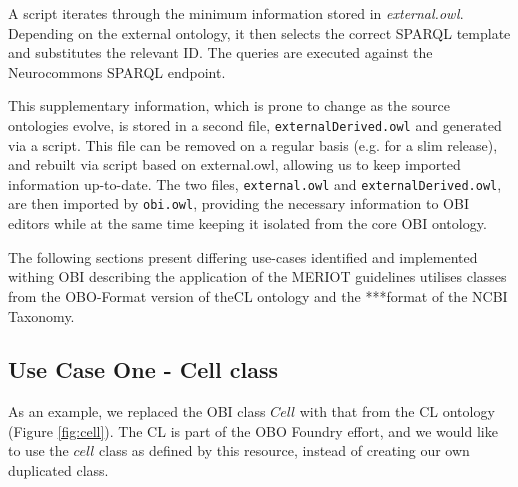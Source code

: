 \documentclass[a4paper,10pt,twocolumn]{article}
\begin{document}
A script iterates through the minimum information stored in \emph{external.owl}.
Depending on the external ontology, it then selects the correct SPARQL template and substitutes the relevant ID.
The queries are executed against the Neurocommons SPARQL endpoint\cite{RefWorks:1540}.

This supplementary information, which is prone to change as the source ontologies evolve, is stored in a second file, \texttt{externalDerived.owl} and generated via a script. 
This file can be removed on a regular basis (e.g. for a slim release), and rebuilt via script based on \texttt{}{external.owl}, allowing us to keep imported information up-to-date.
The two files, \texttt{external.owl} and \texttt{externalDerived.owl}, are then imported by \texttt{obi.owl}, providing the necessary information to OBI editors while at the same time keeping it isolated from the core OBI ontology.

The following sections present differing use-cases identified and implemented withing OBI describing the application of the MERIOT guidelines utilises classes from the \ac{OBO}-Format version of the\ac{CL} ontology and the ***format of the NCBI Taxonomy.

\subsection*{Use Case One - Cell class}

As an example, we replaced the \ac{OBI} class $Cell$ with that from the \ac{CL} ontology \cite{RefWorks:1559} (Figure \ref{fig:cell}).
The \ac{CL} is part of the \ac{OBO} Foundry effort, and we would like to use the $cell$ class as defined by this resource, instead of creating our own duplicated class.
\end{document}
